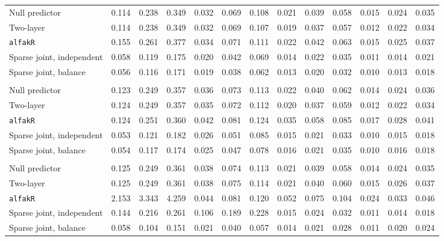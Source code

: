 \begin{center}
\begin{tabular}{l*{12}{r}}
\quad Null predictor & 0.114 & 0.238 & 0.349 & 0.032 & 0.069 & 0.108 & 0.021 & 0.039 & 0.058 & 0.015 & 0.024 & 0.035 \\
\quad Two-layer & 0.114 & 0.238 & 0.349 & 0.032 & 0.069 & 0.107 & 0.019 & 0.037 & 0.057 & 0.012 & 0.022 & 0.034 \\
\quad \texttt{alfakR} & 0.155 & 0.261 & 0.377 & 0.034 & 0.071 & 0.111 & 0.022 & 0.042 & 0.063 & 0.015 & 0.025 & 0.037 \\
\quad Sparse joint, independent & 0.058 & 0.119 & 0.175 & 0.020 & 0.042 & 0.069 & 0.014 & 0.022 & 0.035 & 0.011 & 0.014 & 0.021 \\
\quad Sparse joint, balance & 0.056 & 0.116 & 0.171 & 0.019 & 0.038 & 0.062 & 0.013 & 0.020 & 0.032 & 0.010 & 0.013 & 0.018 \\
\addlinespace[2pt]
\multicolumn{13}{l}{\textit{100/3000, 360 d}} \\
\quad Null predictor & 0.123 & 0.249 & 0.357 & 0.036 & 0.073 & 0.113 & 0.022 & 0.040 & 0.062 & 0.014 & 0.024 & 0.036 \\
\quad Two-layer & 0.124 & 0.249 & 0.357 & 0.035 & 0.072 & 0.112 & 0.020 & 0.037 & 0.059 & 0.012 & 0.022 & 0.034 \\
\quad \texttt{alfakR} & 0.124 & 0.251 & 0.360 & 0.042 & 0.081 & 0.124 & 0.035 & 0.058 & 0.085 & 0.017 & 0.028 & 0.041 \\
\quad Sparse joint, independent & 0.053 & 0.121 & 0.182 & 0.026 & 0.051 & 0.085 & 0.015 & 0.021 & 0.033 & 0.010 & 0.015 & 0.018 \\
\quad Sparse joint, balance & 0.054 & 0.117 & 0.174 & 0.025 & 0.047 & 0.078 & 0.016 & 0.021 & 0.035 & 0.010 & 0.016 & 0.018 \\
\addlinespace[2pt]
\multicolumn{13}{l}{\textit{3000/100, 360 d}} \\
\quad Null predictor & 0.125 & 0.249 & 0.361 & 0.038 & 0.074 & 0.113 & 0.021 & 0.039 & 0.058 & 0.014 & 0.024 & 0.035 \\
\quad Two-layer & 0.125 & 0.249 & 0.361 & 0.038 & 0.075 & 0.114 & 0.021 & 0.040 & 0.060 & 0.015 & 0.026 & 0.037 \\
\quad \texttt{alfakR} & 2.153 & 3.343 & 4.259 & 0.044 & 0.081 & 0.120 & 0.052 & 0.075 & 0.104 & 0.024 & 0.033 & 0.046 \\
\quad Sparse joint, independent & 0.144 & 0.216 & 0.261 & 0.106 & 0.189 & 0.228 & 0.015 & 0.024 & 0.032 & 0.011 & 0.014 & 0.018 \\
\quad Sparse joint, balance & 0.058 & 0.104 & 0.151 & 0.021 & 0.040 & 0.057 & 0.014 & 0.021 & 0.028 & 0.011 & 0.020 & 0.024 \\
\bottomrule
\end{tabular}
\end{center}

